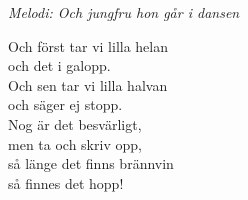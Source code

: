 {\footnotesize\textit{Melodi: Och jungfru hon går i dansen}}\par
\vspace{10pt}
Och först tar vi lilla helan\\
och det i galopp.\\
Och sen tar vi lilla halvan\\
och säger ej stopp.\\
Nog är det besvärligt,\\
men ta och skriv opp,\\
så länge det finns brännvin\\
så finnes det hopp!
